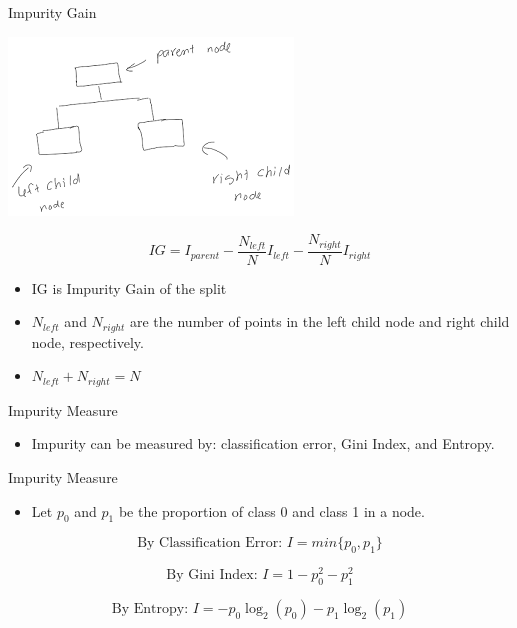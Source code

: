 \documentclass[
  ignorenonframetext,
]{beamer}
\providecommand{\tightlist}{%
  \setlength{\itemsep}{0pt}\setlength{\parskip}{0pt}}
\begin{document}
\begin{frame}{Impurity Gain}
\protect\hypertarget{impurity-gain}{}

\includegraphics{images2/parent_child.png}

\[
IG = I_{parent} - \frac{N_{left}}{N}I_{left}-\frac{N_{right}}{N}I_{right}
\]

\begin{itemize}
\tightlist
\item
  IG is Impurity Gain of the split
\item
  \(N_{left}\) and \(N_{right}\) are the number of points in the left
  child node and right child node, respectively.
\item
  \(N_{left}+N_{right}=N\)
\end{itemize}

\end{frame}

\begin{frame}{Impurity Measure}
\protect\hypertarget{impurity-measure-2}{}

\begin{itemize}
\tightlist
\item
  Impurity can be measured by: classification error, Gini Index, and
  Entropy.
\end{itemize}

\end{frame}

\begin{frame}{Impurity Measure}
\protect\hypertarget{impurity-measure-3}{}

\begin{itemize}
\tightlist
\item
  Let \(p_0\) and \(p_1\) be the proportion of class 0 and class 1 in a
  node.
\end{itemize}

\[
{\text{By Classification Error: }} I = min\{p_0, p_1\}
\]

\[
{\text{By Gini Index: }} I= 1 - p_0^2-p_1^2 
\]

\[
{\text{By Entropy: }} I = -p_0 \log_2(p_0)-p_1\log_2(p_1) 
\]

\end{frame}
\end{document}
